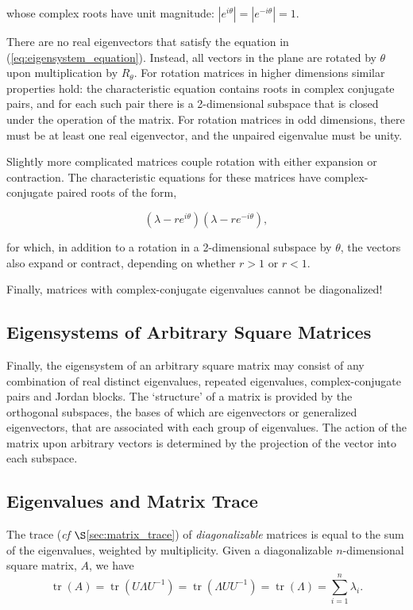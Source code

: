 \documentclass[12pt, twoside, draft]{article}
\begin{document}
whose complex roots have unit magnitude: $|e^{i \theta}| = |e^{-i \theta}| = 1$.

There are no real eigenvectors that satisfy the equation in (\ref{eq:eigensystem_equation}).  Instead, all vectors in the plane are rotated by $\theta$ upon multiplication by $R_\theta$.  For rotation matrices in higher dimensions similar properties hold: the characteristic equation contains roots in complex conjugate pairs, and for each such pair there is a 2-dimensional subspace that is closed under the operation of the matrix.  For rotation matrices in odd dimensions, there must be at least one real eigenvector, and the unpaired eigenvalue must be unity.

Slightly more complicated matrices couple rotation with either expansion or contraction.  The characteristic equations for these matrices have complex-conjugate paired roots of the form,

\begin{equation}\label{eq:spiral_matrix_eigenvalues}
(\lambda - r e^{i \theta})(\lambda - r e^{-i \theta}),
\end{equation}

for which, in addition to a rotation in a 2-dimensional subspace by $\theta$, the vectors also expand or contract, depending on whether $r > 1$ or $r < 1$.

Finally, matrices with complex-conjugate eigenvalues cannot be diagonalized!

\subsection{Eigensystems of Arbitrary Square Matrices}\label{sec:eigensystems-arbitrary}
Finally, the eigensystem of an arbitrary square matrix may consist of any combination of real distinct eigenvalues, repeated eigenvalues, complex-conjugate pairs and Jordan blocks.  The `structure' of a matrix is provided by the orthogonal subspaces, the bases of which are eigenvectors or generalized eigenvectors, that are associated with each group of eigenvalues.  The action of the matrix upon arbitrary vectors is determined by the projection of the vector into each subspace.

\subsection{Eigenvalues and Matrix Trace}\label{sec:eigenvalues_matrix_trace}
The trace (\textit{cf} $\S$\ref{sec:matrix_trace}) of \textit{diagonalizable} matrices is equal to the sum of the eigenvalues, weighted by multiplicity.  Given a diagonalizable $n$-dimensional square matrix, $A$, we have
\begin{equation}
\operatorname{tr}(A) = \operatorname{tr}(U\Lambda U^{-1}) = \operatorname{tr}(\Lambda U U^{-1}) = \operatorname{tr}(\Lambda) = \sum_{i=1}^n \lambda_i.
\end{equation}
\end{document}
